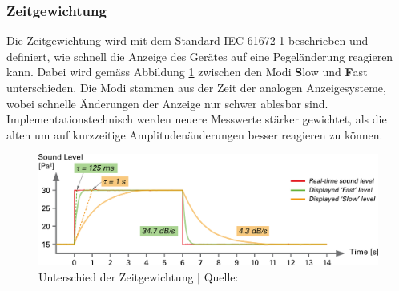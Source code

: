 \documentclass[12pt]{article}
\begin{document}
	\subsubsection*{Zeitgewichtung} \label{Zeitgewichtung}
	Die Zeitgewichtung wird mit dem Standard IEC 61672-1 beschrieben und definiert, wie schnell die Anzeige des Gerätes auf eine Pegeländerung reagieren kann. Dabei wird gemäss Abbildung \ref{fig:batf-s-time-weighting} zwischen den Modi \textbf{S}low und \textbf{F}ast unterschieden. Die Modi stammen aus der Zeit der analogen Anzeigesysteme, wobei schnelle Änderungen der Anzeige nur schwer ablesbar sind. Implementationstechnisch werden neuere Messwerte stärker gewichtet, als die alten um auf kurzzeitige Amplitudenänderungen besser reagieren zu können.
	\begin{figure}[H]
		\centering
		\includegraphics[width=1\linewidth]{images/BAT_F-S-time-weighting}
		\caption{Unterschied der Zeitgewichtung $\vert$ Quelle: \cite{noauthor_was_nodate}}
		\label{fig:batf-s-time-weighting}
	\end{figure}
	
\end{document}
